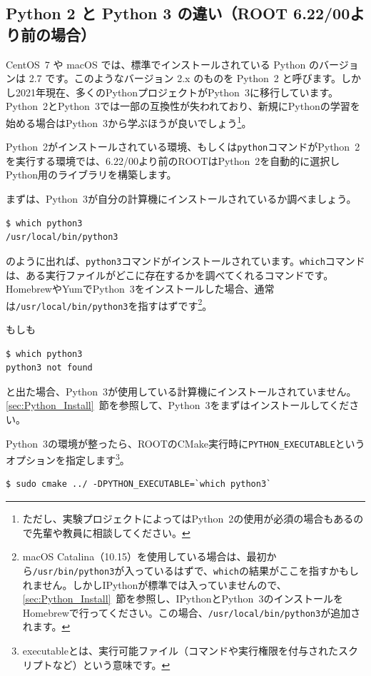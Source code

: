 {\subsection{Python 2 と Python 3 の違い（ROOT 6.22/00より前の場合）}
\label{subsec:python23}

CentOS~7 や macOS では、標準でインストールされている Python のバージョンは 2.7 です。このようなバージョン 2.x のものを Python~2 と呼びます。しかし2021年現在、多くのPythonプロジェクトがPython~3に移行しています。Python~2とPython~3では一部の互換性が失われており、新規にPythonの学習を始める場合はPython~3から学ぶほうが良いでしょう\footnote{ただし、実験プロジェクトによってはPython~2の使用が必須の場合もあるので先輩や教員に相談してください。}。

Python~2がインストールされている環境、もしくは\texttt{python}コマンドがPython~2を実行する環境では、6.22/00より前のROOTはPython~2を自動的に選択しPython用のライブラリを構築します。

まずは、Python~3が自分の計算機にインストールされているか調べましょう。
\begin{lstlisting}
$ which python3
/usr/local/bin/python3
\end{lstlisting}
のように出れば、\texttt{python3}コマンドがインストールされています。\texttt{which}コマンドは、ある実行ファイルがどこに存在するかを調べてくれるコマンドです。HomebrewやYumでPython~3をインストールした場合、通常は\texttt{/usr/local/bin/python3}を指すはずです\footnote{macOS Catalina（10.15）を使用している場合は、最初から\texttt{/usr/bin/python3}が入っているはずで、\texttt{which}の結果がここを指すかもしれません。しかしIPythonが標準では入っていませんので、\ref{sec:Python_Install}~節を参照し、IPythonとPython~3のインストールをHomebrewで行ってください。この場合、\texttt{/usr/local/bin/python3}が追加されます。}。

もしも
\begin{lstlisting}
$ which python3
python3 not found
\end{lstlisting}
と出た場合、Python~3が使用している計算機にインストールされていません。\ref{sec:Python_Install}~節を参照して、Python~3をまずはインストールしてください。

Python~3の環境が整ったら、ROOTのCMake実行時に\texttt{PYTHON\_EXECUTABLE}というオプションを指定します\footnote{executableとは、実行可能ファイル（コマンドや実行権限を付与されたスクリプトなど）という意味です。}。
\begin{lstlisting}
$ sudo cmake ../ -DPYTHON_EXECUTABLE=`which python3`
\end{lstlisting}

}
